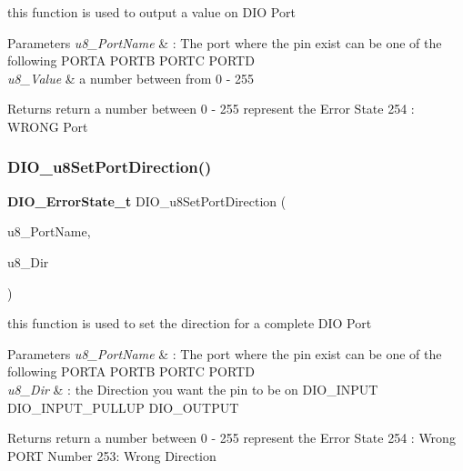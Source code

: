 this function is used to output a value on D\+IO Port 


\begin{DoxyParams}{Parameters}
{\em u8\+\_\+\+Port\+Name} & \+: The port where the pin exist can be one of the following P\+O\+R\+TA P\+O\+R\+TB P\+O\+R\+TC P\+O\+R\+TD \\
\hline
{\em u8\+\_\+\+Value} & a number between from 0 -\/ 255 \\
\hline
\end{DoxyParams}
\begin{DoxyReturn}{Returns}
return a number between 0 -\/ 255 represent the Error State 254 \+: W\+R\+O\+NG Port 
\end{DoxyReturn}
\mbox{\label{_d_i_o__interface_8h_a111708547dfc164a8c01bf7901a1cd36}} 
\subsubsection{D\+I\+O\+\_\+u8\+Set\+Port\+Direction()}
{\footnotesize\ttfamily \textbf{ D\+I\+O\+\_\+\+Error\+State\+\_\+t} D\+I\+O\+\_\+u8\+Set\+Port\+Direction (\begin{DoxyParamCaption}\item[{\textbf{ D\+I\+O\+Port\+\_\+t}}]{u8\+\_\+\+Port\+Name,  }\item[{\textbf{ D\+I\+O\+Dir\+\_\+t}}]{u8\+\_\+\+Dir }\end{DoxyParamCaption})}



this function is used to set the direction for a complete D\+IO Port 


\begin{DoxyParams}{Parameters}
{\em u8\+\_\+\+Port\+Name} & \+: The port where the pin exist can be one of the following P\+O\+R\+TA P\+O\+R\+TB P\+O\+R\+TC P\+O\+R\+TD \\
\hline
{\em u8\+\_\+\+Dir} & \+: the Direction you want the pin to be on D\+I\+O\+\_\+\+I\+N\+P\+UT D\+I\+O\+\_\+\+I\+N\+P\+U\+T\+\_\+\+P\+U\+L\+L\+UP D\+I\+O\+\_\+\+O\+U\+T\+P\+UT \\
\hline
\end{DoxyParams}
\begin{DoxyReturn}{Returns}
return a number between 0 -\/ 255 represent the Error State 254 \+: Wrong P\+O\+RT Number 253\+: Wrong Direction 
\end{DoxyReturn}
\mbox{\label{_d_i_o__interface_8h_a105d674e17ed95c8016fa7f6a1c6dde0}} 
